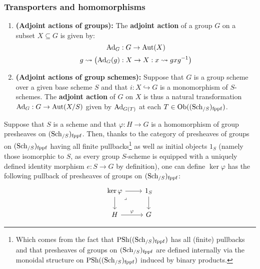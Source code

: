         \subsubsection{Transporters and homomorphisms}
            \begin{definition} \label{def: adjoint_actions}
                \noindent
                \begin{enumerate}
                    \item \textbf{(Adjoint actions of groups):} The \textbf{adjoint action} of a group $G$ on a subset $X \subseteq G$ is given by:
                        $$\mathrm{Ad}_G: G \to \mathrm{Aut}(X)$$
                        $$g \leadsto \left(\mathrm{Ad}_G(g): X \to X: x \leadsto gxg^{-1}\right)$$
                    \item \textbf{(Adjoint actions of group schemes):} Suppose that $G$ is a group scheme over a given base scheme $S$ and that $i: X \hookrightarrow G$ is a monomorphism of $S$-schemes. The \textbf{adjoint action} of $G$ on $X$ is thus a natural transformation $\mathrm{Ad}_G: G \to \mathrm{Aut}(X/S)$ given by $\mathrm{Ad}_{G(T)}$ at each $T \in \mathrm{Ob}((\mathrm{Sch}_{/S})_{\mathrm{fppf}})$.
                \end{enumerate}
            \end{definition}
            \begin{definition}[Kernels] \label{def: kernels_of_homomorphisms_of_group_schemes}
                Suppose that $S$ is a scheme and that $\varphi: H \to G$ is a homomorphism of group presheaves on $(\mathrm{Sch}_{/S})_{\mathrm{fppf}}$. Then, thanks to the category of presheaves of groups on $(\mathrm{Sch}_{/S})_{\mathrm{fppf}}$ having all finite pullbacks\footnote{Which comes from the fact that $\mathrm{PSh}((\mathrm{Sch}_{/S})_{\mathrm{fppf}})$ has all (finite) pullbacks and that presheaves of groups on $(\mathrm{Sch}_{/S})_{\mathrm{fppf}}$ are defined internally via the monoidal structure on $\mathrm{PSh}((\mathrm{Sch}_{/S})_{\mathrm{fppf}})$ induced by binary products.} as well as initial objects $1_S$ (namely those isomorphic to $S$, as every group $S$-scheme is equipped with a uniquely defined identity morphism $e: S \to G$ by definition), one can define $\ker \varphi$ has the following pullback of presheaves of groups on $(\mathrm{Sch}_{/S})_{\mathrm{fppf}}$:
                    $$
                        \begin{tikzcd}
                        	{\ker \varphi} & {1_S} \\
                        	H & G
                        	\arrow[from=1-2, to=2-2]
                        	\arrow["\varphi", from=2-1, to=2-2]
                        	\arrow[from=1-1, to=2-1]
                        	\arrow[from=1-1, to=1-2]
                        	\arrow["\lrcorner"{anchor=center, pos=0.125}, draw=none, from=1-1, to=2-2]
                        \end{tikzcd}
                    $$
            \end{definition}
